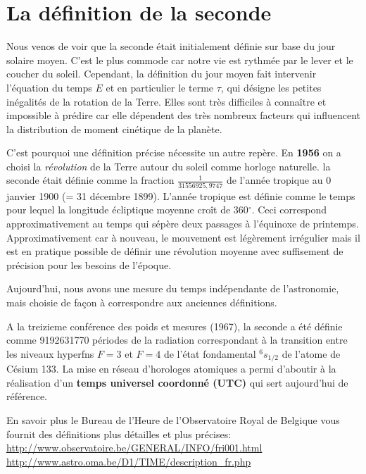 \documentclass[12pt]{report}
\begin{document}
\section{La définition de la seconde}
Nous venos de voir que la seconde était initialement définie sur base du jour solaire moyen. C'est le plus commode car notre vie est rythmée par le lever et le coucher du soleil. Cependant, la définition du jour moyen fait intervenir l'équation du temps $E$ et en particulier le terme $\tau$, qui désigne les petites inégalités de la rotation de la Terre. Elles sont très difficiles à connaître et impossible à prédire car elle dépendent des très nombreux facteurs qui influencent la distribution de moment cinétique de la planète. 

C'est pourquoi une définition précise nécessite un autre repère.
En \textbf{1956} on a choisi la \textit{révolution} de la Terre autour du soleil comme horloge naturelle. la seconde était définie comme la fraction $\frac{1}{31556925,9747}$ de l'année tropique au 0 janvier 1900 (= 31 décembre 1899). L'année tropique est définie comme le temps pour lequel la longitude écliptique moyenne croît de 360$^\circ$. Ceci correspond approximativement au temps qui sépère deux passages à l'équinoxe de printemps. Approximativement car à nouveau, le mouvement est légèrement irrégulier mais il est en pratique possible de définir une révolution moyenne avec suffisement de précision pour les besoins de l'époque. 

Aujourd'hui, nous avons une mesure du temps indépendante de l'astronomie, mais choisie de façon à correspondre aux anciennes définitions.

A la treizieme conférence des poids et mesures (1967), la seconde a été définie comme 9192631770 périodes de la radiation correspondant à la transition entre les niveaux hyperfns $F=3$ et $F=4$ de l'état fondamental $^6 s_{1/2}$ de l'atome de Césium 133.  La mise en réseau d'horologes atomiques a permi d'aboutir à la réalisation d'un \textbf{temps universel coordonné (UTC)} qui sert aujourd'hui de référence. 

En savoir plus le Bureau de l'Heure de l'Observatoire Royal de Belgique vous fournit des définitions plus détailles et plus précises: \\
\noindent
\url{http://www.observatoire.be/GENERAL/INFO/fri001.html} \\
\url{http://www.astro.oma.be/D1/TIME/description_fr.php}
\end{document}
